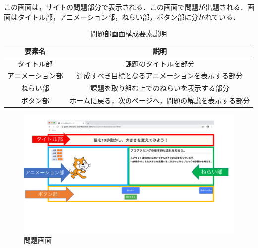 この画面は，サイトの問題部分で表示される．この画面で問題が出題される．画面はタイトル部，アニメーション部，ねらい部，ボタン部に分かれている．
\begin{table}[htb]
\begin{center}
    \caption{問題部画面構成要素説明}
  \begin{tabular}{|c|c|} \hline
     要素名  & 説明  \\ \hline
     タイトル部& 課題のタイトルを部分 \\ \hline
      アニメーション部& 達成すべき目標となるアニメーションを表示する部分 \\ \hline
      ねらい部& 課題を取り組む上でのねらいを表示する部分 \\ \hline
      ボタン部& ホームに戻る，次のページへ，問題の解説を表示する部分\\ \hline
  \end{tabular}
  \label{tab:bamen1}
  \end{center}
\end{table}
\begin{figure}[h]
\begin{center}
\includegraphics[width=15cm]{mondaigamen.pdf}
\caption{問題画面}
\label{fig:houhou}
\end{center}
\end{figure}

\newpage


